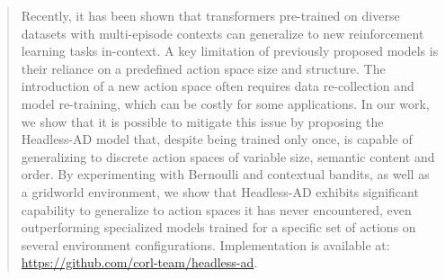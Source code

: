 \documentclass{article}
\theoremstyle{plain}
\theoremstyle{definition}
\theoremstyle{remark}
\begin{document}
\printAffiliationsAndNotice{\icmlEqualContribution} %

\begin{abstract}
Recently, it has been shown that transformers pre-trained on diverse datasets with multi-episode contexts can generalize to new reinforcement learning tasks in-context. A key limitation of previously proposed models is their reliance on a predefined action space size and structure. The introduction of a new action space often requires data re-collection and model re-training, which can be costly for some applications. In our work, we show that it is possible to mitigate this issue by proposing the Headless-AD model that, despite being trained only once, is capable of generalizing to discrete action spaces of variable size, semantic content and order. By experimenting with Bernoulli and contextual bandits, as well as a gridworld environment, we show that Headless-AD exhibits significant capability to generalize to action spaces it has never encountered, even outperforming specialized models trained for a specific set of actions on several environment configurations. Implementation is available at: \url{https://github.com/corl-team/headless-ad}.
\end{abstract}
















\newpage
\appendix
\onecolumn














\end{document}
